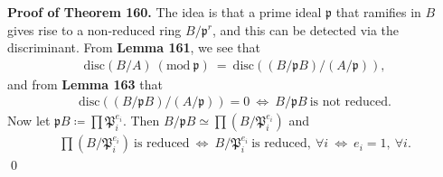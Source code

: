 \documentclass[12pt,a4paper,footinclude=true,headinclude=true]{scrbook} %
\newenvironment{proofthm}[2][Proof of Theorem]
    { \begin{mdframed}[backgroundcolor=gray!20] \textbf{#1 #2.} }
    {  \end{mdframed}}
\begin{document}
\begin{proofthm}{160}
    The idea is that a prime ideal $\mathfrak{p}$ that ramifies in $B$ gives rise to a non-reduced ring $B/\mathfrak{p}^r$, and this can be detected via the discriminant. From \textbf{Lemma 161}, we see that
    \begin{align*}
        \mathrm{disc}(B/A)\ (\mathrm{mod}\ \mathfrak{p})\ =\  \mathrm{disc}((B/\mathfrak{p}B)/(A/\mathfrak{p})),
    \end{align*}
    and from \textbf{Lemma 163} that 
    \begin{align*}
        \mathrm{disc}((B/\mathfrak{p}B)/(A/\mathfrak{p}))=0\ \Longleftrightarrow\ B/\mathfrak{p}B\ \text{is not reduced}.
    \end{align*}
    Now let $\mathfrak{p}B\coloneqq\prod\mathfrak{P}_i^{e_i}$. Then $B/\mathfrak{p}B \simeq\prod(B/\mathfrak{P}_i^{e_i})$ and 
    \begin{align*}
        \prod(B/\mathfrak{P}_i^{e_i})\ \text{is reduced}\ \Longleftrightarrow\ B/\mathfrak{P}_i^{e_i}\ \text{is reduced},\ \forall i\ \Longleftrightarrow\ e_i=1,\ \forall i. 
    \end{align*}\qed
\end{proofthm}
\end{document}
